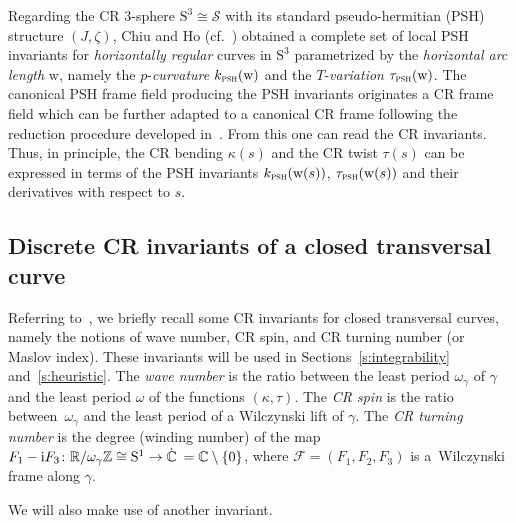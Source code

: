 \documentclass[10pt,a4paper]{amsart}
\numberwithin{equation}{section}
\def\C{\mathbb{C}}
\def\R{\mathbb{R}}
\def\Z{\mathbb{Z}}
\begin{document}
\begin{Remark}
Regarding the CR 3-sphere $\mathrm{S}^3\cong \mathcal{S}$ with its standard pseudo-her\-mi\-tian (PSH) structure $(J,\zeta)$,
Chiu and Ho (cf.~\cite{Chiu-Ho2019})
obtained a complete set of local PSH invariants
for \textit{horizontally regular} curves in $\mathrm{S}^3$
parametrized by the \textit{horizontal arc length} $\mathrm{w}$, namely
the $p$-\textit{curvature} $k_{\textsc{psh}}(\mathrm{w})$ and the $T$-\textit{variation} $\tau_{\textsc{psh}}(\mathrm{w})$.
The canonical PSH frame field
producing
the PSH invariants originates a
CR frame field which can be further adapted to a canonical CR frame following the reduction
procedure developed
in~\cite{MNS-Kharkiv}.
From this one can read the CR invariants.
%
Thus, in principle, the CR bending $\kappa(s)$ and the CR twist $\tau(s)$ can be
expressed in terms of the PSH invariants $k_{\textsc{psh}}(\mathrm{w}(s))$, $\tau_{\textsc{psh}}(\mathrm{w}(s))$
and their derivatives with respect to $s$.
\end{Remark}
\subsection{Discrete CR invariants of a closed transversal curve}

Referring to~\cite{MNS-Kharkiv,MS}, we briefly recall some CR invariants for closed transversal curves, namely
the notions of wave number, CR spin, and CR turning number (or Maslov index). These invariants will be used in Sections~\ref{s:integrability} and~\ref{s:heuristic}.
The \textit{wave number} is the ratio between the least period $\omega_{\gamma}$ of $\gamma$ and the least period $\omega$ of
the functions $(\kappa,\tau)$. The \textit{CR spin} is the ratio between~$\omega_{\gamma}$ and the least period
of a Wilczynski lift of $\gamma$.
The \textit{CR turning number} is
the degree (winding number) of the map
$F_1-{\rm i}F_3\colon \R/\omega_{\gamma}\Z \cong \mathrm{S}^1 \to \dot{\C}\: = \mathbb{C}\setminus \{0\}$,
where $\mathcal{F}=(F_1,F_2,F_3)$ is a~Wilczynski frame along $\gamma$.

We will also make use of another invariant.
\end{document}
